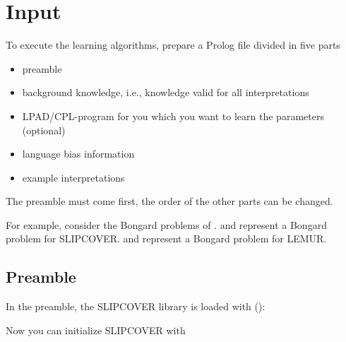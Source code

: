 \documentclass[letterpaper,10pt,english]{sphinxmanual}
\begin{document}
\section{Input}
\label{\detokenize{index:input}}
To execute the learning algorithms, prepare a Prolog file divided in five parts
\begin{itemize}
\item {} 
preamble

\item {} 
background knowledge, i.e., knowledge valid for all interpretations

\item {} 
LPAD/CPL-program for you which you want to learn the parameters (optional)

\item {} 
language bias information

\item {} 
example interpretations

\end{itemize}

The preamble must come first, the order of the other parts can be changed.

For example, consider the Bongard problems of .  and  represent a Bongard problem for SLIPCOVER.
 and  represent a Bongard problem for LEMUR.


\subsection{Preamble}
\label{\detokenize{index:preamble}}
In the preamble, the SLIPCOVER library is loaded with ():

\begin{sphinxVerbatim}[commandchars=\\\{\}]
 
\end{sphinxVerbatim}

Now you can initialize SLIPCOVER with

\begin{sphinxVerbatim}[commandchars=\\\{\}]
 
\end{sphinxVerbatim}
\end{document}
